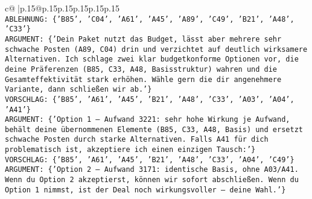 \documentclass{article}
\begin{document}
{\begin{supertabular}{c@{$\;$}|p{.15\linewidth}@{}p{.15\linewidth}p{.15\linewidth}p{.15\linewidth}p{.15\linewidth}p{.15\linewidth}}
{{{\\ 
\texttt{ABLEHNUNG: \{'B85', 'C04', 'A61', 'A45', 'A89', 'C49', 'B21', 'A48', 'C33'\}} \\
\texttt{ARGUMENT: \{'Dein Paket nutzt das Budget, lässt aber mehrere sehr schwache Posten (A89, C04) drin und verzichtet auf deutlich wirksamere Alternativen. Ich schlage zwei klar budgetkonforme Optionen vor, die deine Präferenzen (B85, C33, A48, Basisstruktur) wahren und die Gesamteffektivität stark erhöhen. Wähle gern die dir angenehmere Variante, dann schließen wir ab.'\}} \\
\texttt{VORSCHLAG: \{'B85', 'A61', 'A45', 'B21', 'A48', 'C33', 'A03', 'A04', 'A41'\}} \\
\texttt{ARGUMENT: \{'Option 1 – Aufwand 3221: sehr hohe Wirkung je Aufwand, behält deine übernommenen Elemente (B85, C33, A48, Basis) und ersetzt schwache Posten durch starke Alternativen. Falls A41 für dich problematisch ist, akzeptiere ich einen einzigen Tausch:'\}} \\
\texttt{VORSCHLAG: \{'B85', 'A61', 'A45', 'B21', 'A48', 'C33', 'A04', 'C49'\}} \\
\texttt{ARGUMENT: \{'Option 2 – Aufwand 3171: identische Basis, ohne A03/A41. Wenn du Option 2 akzeptierst, können wir sofort abschließen. Wenn du Option 1 nimmst, ist der Deal noch wirkungsvoller – deine Wahl.'\}} \\
            }
        }
    }
     \\ \\


\end{supertabular}}
\end{document}
